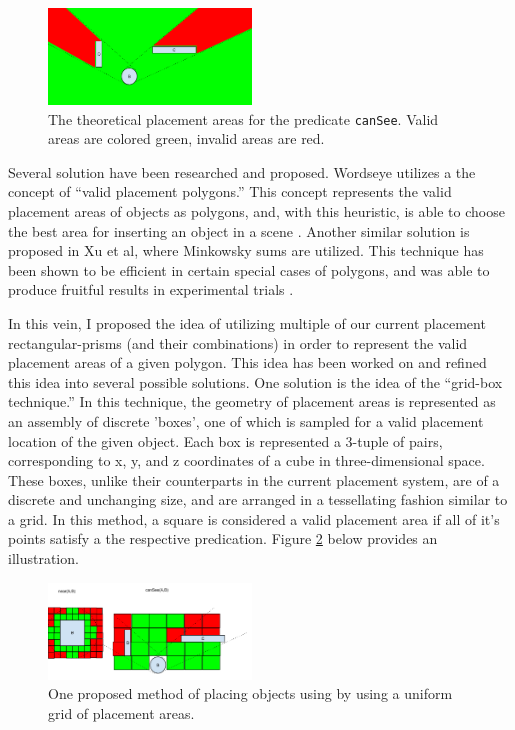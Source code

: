 \begin{figure}[h]
	\begin{center}
		\includegraphics[width=0.48\textwidth]{figures/vision_placement_theoretical.png}
	\caption{The theoretical placement areas for the predicate \texttt{canSee}. Valid areas are colored green, invalid areas are red.}
	\label{fig:vision_placement_theoretical}
	\end{center}
\end{figure}

Several solution have been researched and proposed. Wordseye utilizes a the concept of ``valid placement polygons.'' 
This concept represents the valid placement areas of objects as polygons, and, with this heuristic, is able to choose the best area for inserting an object in a scene \cite{wordseye}. 
Another similar solution is proposed in Xu et al, where Minkowsky sums are utilized. This technique has been shown to be efficient in certain special cases of polygons, and was able to produce fruitful results in experimental trials \cite{xu2002constraint}. 

In this vein, I proposed the idea of utilizing multiple of our current placement rectangular-prisms (and their combinations) in order to represent the valid placement areas of a given polygon. 
This idea has been worked on and refined this idea into several possible solutions. One solution is the idea of the ``grid-box technique.'' 
In this technique, the geometry of placement areas is represented as an assembly of discrete 'boxes', one of which is sampled for a valid placement location of the given object.
Each box is represented a 3-tuple of pairs, corresponding to x, y, and z coordinates of a cube in three-dimensional space. 
These boxes, unlike their counterparts in the current placement system, are of a discrete and unchanging size, and are arranged in a tessellating fashion similar to a grid. 
In this method, a square is considered a valid placement area if all of it's points satisfy a the respective predication. Figure \ref{fig:grid_placement} below provides an illustration.

\begin{figure}[h]
	\begin{center}
		\includegraphics[width=0.48\textwidth]{figures/grid_placement.png}
	\caption{One proposed method of placing objects using by using a uniform grid of placement areas.}
	\label{fig:grid_placement}
	\end{center}
\end{figure}

